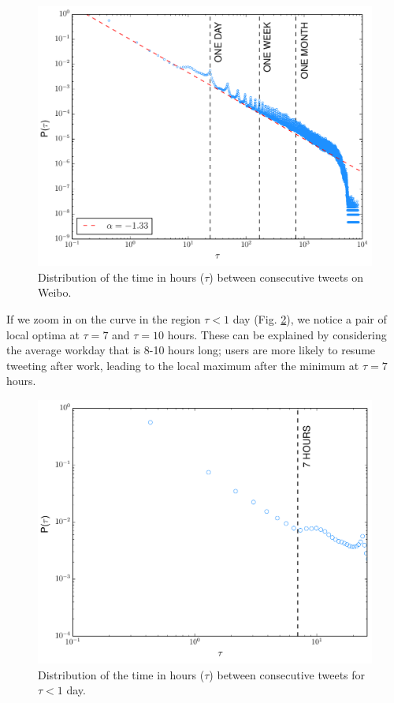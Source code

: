 \documentclass[onecolumn, 12 pt, doublespace, fullpage, letterpaper]{report}
\begin{document}
\begin{figure}
  \includegraphics[width=\linewidth]{weibo_iet}
  \caption[Weibo intertweet time distribution.]{Distribution of the time in hours ($\tau$) between consecutive tweets on Weibo.}
  \label{fig:weibo-iet}
\end{figure}

If we zoom in on the curve in the region $\tau < 1$ day (Fig. \ref{fig:weibo-iet-zoomed}), we notice a pair of local optima at $\tau = 7$ and $\tau = 10$ hours. These can be explained by considering the average workday that is 8-10 hours long; users are more likely to resume tweeting after work, leading to the local maximum after the minimum at $\tau = 7$ hours.

\begin{figure}
    \includegraphics[width=\linewidth]{weibo_iet_zoomed}
    \caption[Weibo intertweet time distribution for $\tau < 1$ day.]{Distribution of the time in hours ($\tau$) between consecutive tweets for $\tau < 1$ day.}
    \label{fig:weibo-iet-zoomed}
\end{figure}
\end{document}
